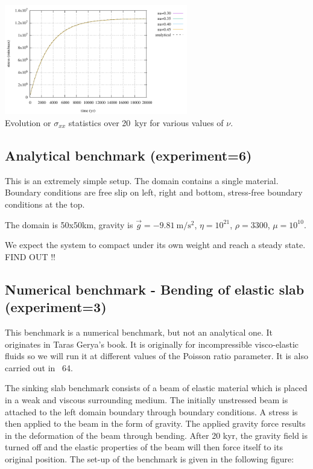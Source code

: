 \begin{center}
\includegraphics[width=8cm]{python_codes/fieldstone_129/results/experiment2/stats_stress}\\
{\captionfont Evolution or $\sigma_{xx}$ statistics over 20~kyr for various values of $\nu$.}
\end{center} 

\newpage
\subsection*{Analytical benchmark (experiment=6)}

This is an extremely simple setup. The domain contains a single material. 
Boundary conditions are free slip on left, right and bottom, stress-free boundary conditions 
at the top. 

The domain is 50x50km, gravity is $\vec{g}=-9.81~\si{\meter\per\square\second}$, 
$\eta=10^{21}$, $\rho=3300$, $\mu=10^{10}$.

We expect the system to compact under its own weight and reach a 
steady state. FIND OUT !!





\newpage
\subsection*{Numerical benchmark - Bending of elastic slab (experiment=3)}

This benchmark is a numerical benchmark, but not an analytical one. 
It originates in Taras Gerya's book. It is originally for incompressible visco-elastic fluids so we will run it at different values of the Poisson ratio parameter.
It is also carried out in \stone~64.

The sinking slab benchmark consists of a beam of elastic material which is placed 
in a weak and viscous surrounding medium. The initially unstressed beam is attached 
to the left domain boundary through boundary conditions. A stress is then applied to  
the beam in the form of gravity. The applied gravity force results in the deformation 
of the beam through bending. After 20 kyr, the gravity field is turned off and the 
elastic properties of the beam will then force itself to its original position.  
The set-up of the benchmark is given in the following figure: 

